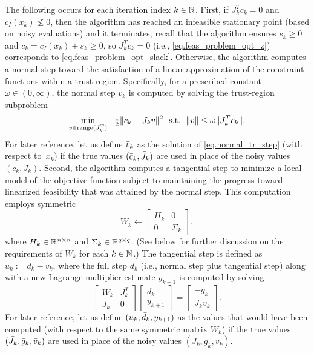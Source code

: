 The following occurs for each iteration index $k \in \mathbb{N}$.  First, if $J_k^Tc_k = 0$ and $c_I(x_k) \not\leq 0$, then the algorithm has reached an infeasible stationary point (based on noisy evaluations) and it terminates; recall that the algorithm ensures $s_k \geq 0$ and $c_k = c_I(x_k) + s_k \geq 0$, so $J_k^Tc_k = 0$ (i.e., \eqref{eq.feas_problem_opt_z}) corresponds to \eqref{eq.feas_problem_opt_slack}.  Otherwise, the algorithm computes a normal step toward the satisfaction of a linear approximation of the constraint functions within a trust region.  Specifically, for a prescribed constant $\omega \in (0,\infty)$, the normal step $v_k$ is computed by solving the trust-region subproblem
\begin{equation}\label{eq.normal_tr_step}
  \min_{v \in \mathrm{range}(J_k^T)}\ \ \tfrac{1}{2} \| c_k + J_k v\|^2\ \ \st\ \ \|v\| \leq \omega \|J_k^T c_k\|.
\end{equation}
For later reference, let us define ${\bar v}_k$ as the solution of \eqref{eq.normal_tr_step} (with respect to~$x_k$) if the true values $({\bar c}_k, {\bar J}_k)$ are used in place of the noisy values $(c_k, J_k)$.  Second, the algorithm computes a tangential step to minimize a local model of the objective function subject to maintaining the progress toward linearized feasibility that was attained by the normal step.  This computation employs symmetric
\begin{equation}\label{eq.W}
  W_k \gets \begin{bmatrix} H_k & 0 \\ 0 & \Sigma_k \end{bmatrix},
\end{equation}
where $H_k \in \mathbb{R}^{n \times n}$ and $\Sigma_k \in \mathbb{R}^{q \times q}$.  (See below for further discussion on the requirements of $W_k$ for each $k \in \mathbb{N}$.)  The tangential step is defined as $u_k := d_k - v_k$, where the full step $d_k$ (i.e., normal step plus tangential step) along with a new Lagrange multiplier estimate $y_{k+1}$ is computed by solving
\begin{equation}\label{eq.perturbed_newton_sys}
  \begin{bmatrix} W_k & J_k^T \\ J_k & 0 \end{bmatrix} \begin{bmatrix} d_k \\ y_{k+1} \end{bmatrix} = \begin{bmatrix} -g_k \\ J_k v_k \end{bmatrix}.
\end{equation}
For later reference, let us define $({\bar u}_k, {\bar d}_k, {\bar y}_{k+1})$ as the values that would have been computed (with respect to the same symmetric matrix $W_k$) if the true values $({\bar J}_k, {\bar g}_k, {\bar v}_k)$ are used in place of the noisy values $(J_k, g_k, v_k)$.

